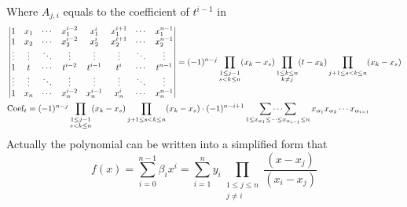 \documentclass[11pt]{article}
\begin{document}
Where $A_{j,i}$ equals to the coefficient of $t^{i-1}$ in
\begin{equation}
\begin{aligned}
    &\begin{vmatrix}
    1 & x_1 & \cdots & x_1^{i-2} & x_1^{i} & x_1^{i+1} & \cdots & x_1^{n-1}\\
    1 & x_2 & \cdots & x_2^{i-2} & x_2^{i} & x_2^{i+1} & \cdots & x_2^{n-1}\\
    \vdots & \vdots & \ddots & \vdots & \vdots & \vdots & \ddots & \vdots \\
    1 & t & \cdots & t^{i-2} & t^{i-1} & t^i & \cdots & t^{n-1} \\
    \vdots & \vdots & \ddots & \vdots & \vdots & \vdots & \ddots & \vdots \\
    1 & x_n & \cdots & x_n^{i-2} & x_n^{i-1} & x_n^{i} & \cdots & x_n^{n-1}\\
    \end{vmatrix} = (-1)^{n-j}\prod_{\substack{1\leq j-1 \\ s < k \leq n}}(x_k-x_s)  \prod_{\substack{1 \leq k \leq n \\ k \neq j}} (t-x_k) \prod_{j+1 \leq s < k \leq n}(x_k-x_s)\\
    &\text{Coef}_t= (-1)^{n-j}\prod_{\substack{1\leq j-1 \\ s < k \leq n}}(x_k-x_s) \prod_{j+1 \leq s < k \leq n}(x_k-x_s)\cdot(-1)^{n-i+1}\mathop{\sum \cdots \sum}\limits_{1 \leq x_{\alpha_1}  \leq \cdots \leq x_{\alpha_{i-1}} \leq n} x_{\alpha_1}x_{\alpha_2}\cdots x_{\alpha_{i-1}}
\end{aligned} \notag
\end{equation}
Actually the polynomial can be written into a simplified form that
\begin{equation}
    f(x) = \sum_{i=0}^{n-1}\beta_{i}x^{i} = \sum_{i=1}^{n} y_i \prod_{\substack{1 \leq j \leq n \\ j \neq i }} \frac{(x-x_j)}{(x_i - x_j)}
\end{equation}
\end{document}
